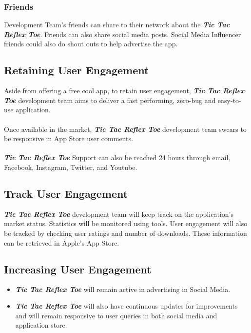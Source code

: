 \documentclass{article}
\begin{document}
    \subsubsection{Friends}
        Development Team's friends can share to their network about the \textbf{\emph{Tic Tac Reflex Toe}}. Friends can also share social media posts.  Social Media Influencer friends could also do shout outs to help advertise the app.
   \newpage
\subsection{Retaining User Engagement}
    Aside from offering a free cool app, to retain user engagement, \textbf{\emph{Tic Tac Reflex Toe}} development team aims to deliver a fast performing, zero-bug and easy-to-use application.\\\\
    Once available in the market, \textbf{\emph{Tic Tac Reflex Toe}} development team swears to be responsive in  App Store user comments.\\\\
    \textbf{\emph{Tic Tac Reflex Toe}} Support can also be reached 24 hours through email, Facebook, Instagram, Twitter, and Youtube.
    ~\newline

\subsection{Track User Engagement}
    \textbf{\emph{Tic Tac Reflex Toe}} development team will keep track on the application's market status.  Statistics will be monitored using tools.  User engagement will also be tracked by 
    checking user ratings and number of downloads.  These information can be retrieved in Apple’s App Store.  
    ~\newline
\subsection{Increasing User Engagement}
    \begin{itemize}
        \item \textbf{\emph{Tic Tac Reflex Toe}} will remain active in advertising in Social Media.
        \item \textbf{\emph{Tic Tac Reflex Toe}} will also have continuous updates for improvements and will remain responsive to user queries in both social media and application store.
    \end{itemize}
    
\end{document}
